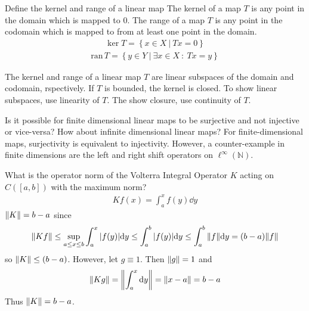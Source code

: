 \documentclass[avery5388,grid,frame]{flashcards}
\begin{document}
\begin{flashcard}
    {Define the kernel and range of a linear map}
    The kernel of a map $T$ is any point in the domain which is mapped to $0$.  The range of a map $T$ is any point in the codomain which is mapped to from at least one point in the domain.
    \begin{align*}
        \ker T = \left\{x \in X\ |\ Tx = 0\right\}
    \end{align*}
    \begin{align*}
        \text{ran}\,T = \left\{y \in Y\ |\ \exists x \in X\ :\ Tx = y\right\}
    \end{align*}
\end{flashcard}

\begin{flashcard}
    {The kernel and range of a linear map $T$ are linear subspaces of the domain and codomain, rspectively.  If $T$ is bounded, the kernel is closed.}
    To show linear subspaces, use linearity of $T$.  The show closure, use continuity of $T$.
\end{flashcard}

\begin{flashcard}
    {Is it possible for finite dimensional linear maps to be surjective and not injective or vice-versa?  How about infinite dimensional linear maps?}
    For finite-dimensional maps, surjectivity is equivalent to injectivity.  However, a counter-example in finite dimensions are the left and right shift operators on $\ell^\infty(\mathbb{N})$.
\end{flashcard}

\begin{flashcard}
    {What is the operator norm of the Volterra Integral Operator $K$ acting on $C([a,b])$ with the maximum norm? \\ \begin{align*}Kf(x) = \int_a^x f(y) \dd y\end{align*}}
    $\norm{K} = b-a$ since
    \begin{align*}
        \norm{Kf} \leq \sup_{a\leq x \leq b}\int_a^x \abs{f(y)}\dd y \leq \int_a^b \abs{f(y)} \dd y \leq \int_a^b\norm{f}\dd y = (b - a)\norm{f}
    \end{align*}
    so $\norm{K} \leq (b - a)$.  However, let $g \equiv 1$.  Then $\norm{g} = 1$ and 
    \begin{align*}
        \norm{Kg} = \norm{\int_a^x \dd y} = \norm{x - a} = b - a
    \end{align*}
    Thus $\norm{K} = b - a$.
\end{flashcard}
\end{document}

